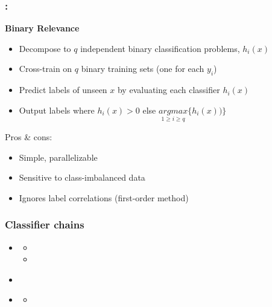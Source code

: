 \documentclass{beamer}
\begin{document}
\begin{frame}

\frametitle{\insertsection : \insertsubsection}
\textbf{Binary Relevance}
\begin{itemize}
	\item Decompose to $q$ independent binary classification problems, $h_i(x)$
	\item Cross-train on $q$ binary training sets (one for each $y_i$)
	\item Predict labels of unseen $x$ by evaluating each classifier $h_i(x)$
	\item Output labels where  $h_i(x) > 0$ else $\underset{1 \geq i \geq q}{argmax} \{h_i(x))\}$ 
\end{itemize}

Pros \& cons:
\begin{itemize}
	\item Simple, parallelizable
	\item Sensitive to class-imbalanced data
	\item Ignores label correlations (first-order method)
\end{itemize}

\end{frame}

\begin{frame}
\frametitle{Classifier chains}
\begin{itemize}
\item <2-> 
\begin{itemize}
\item 
\item <4-> 
\end{itemize}
\end{itemize}
\begin{itemize}
\item<5-> 
\end{itemize}

\begin{itemize}
\item <7-> 
\begin{itemize}
\item <8-> 
\end{itemize}
\end{itemize}
\end{frame}
\end{document}
